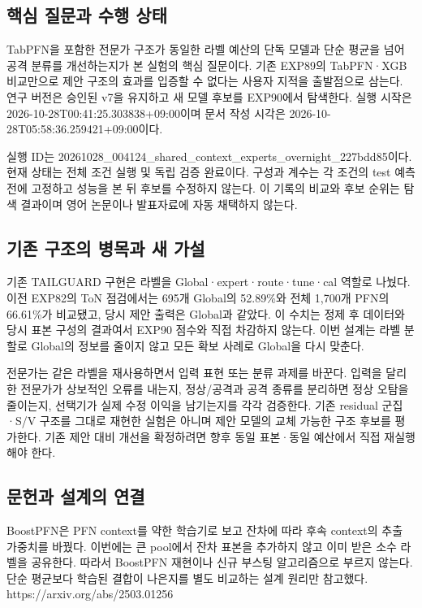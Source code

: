 

\subsection{핵심 질문과 수행 상태}
TabPFN을 포함한 전문가 구조가 동일한 라벨 예산의 단독 모델과 단순 평균을 넘어 공격 분류를 개선하는지가 본 실험의 핵심 질문이다. 기존 EXP89의 TabPFN·XGB 비교만으로 제안 구조의 효과를 입증할 수 없다는 사용자 지적을 출발점으로 삼는다. 연구 버전은 승인된 v7을 유지하고 새 모델 후보를 EXP90에서 탐색한다. 실행 시작은 2026-10-28T00:41:25.303838+\allowbreak{}09:00이며 문서 작성 시각은 2026-10-28T05:58:36.259421+\allowbreak{}09:00이다.

실행 ID는 20261028\_\allowbreak{}004124\_\allowbreak{}shared\_\allowbreak{}context\_\allowbreak{}experts\_\allowbreak{}overnight\_\allowbreak{}227bdd85이다. 현재 상태는 전체 조건 실행 및 독립 검증 완료이다. 구성과 계수는 각 조건의 test 예측 전에 고정하고 성능을 본 뒤 후보를 수정하지 않는다. 이 기록의 비교와 후보 순위는 탐색 결과이며 영어 논문이나 발표자료에 자동 채택하지 않는다.

\subsection{기존 구조의 병목과 새 가설}
기존 TAILGUARD 구현은 라벨을 Global·expert·route·tune·cal 역할로 나눴다. 이전 EXP82의 ToN 점검에서는 695개 Global의 52.89\%와 전체 1,700개 PFN의 66.61\%가 비교됐고, 당시 제안 출력은 Global과 같았다. 이 수치는 정제 후 데이터와 당시 표본 구성의 결과여서 EXP90 점수와 직접 차감하지 않는다. 이번 설계는 라벨 분할로 Global의 정보를 줄이지 않고 모든 확보 사례로 Global을 다시 맞춘다.

전문가는 같은 라벨을 재사용하면서 입력 표현 또는 분류 과제를 바꾼다. 입력을 달리한 전문가가 상보적인 오류를 내는지, 정상/\allowbreak{}공격과 공격 종류를 분리하면 정상 오탐을 줄이는지, 선택기가 실제 수정 이익을 남기는지를 각각 검증한다. 기존 residual 군집·S/\allowbreak{}V 구조를 그대로 재현한 실험은 아니며 제안 모델의 교체 가능한 구조 후보를 평가한다. 기존 제안 대비 개선을 확정하려면 향후 동일 표본·동일 예산에서 직접 재실행해야 한다.

\subsection{문헌과 설계의 연결}
BoostPFN은 PFN context를 약한 학습기로 보고 잔차에 따라 후속 context의 추출 가중치를 바꿨다. 이번에는 큰 pool에서 잔차 표본을 추가하지 않고 이미 받은 소수 라벨을 공유한다. 따라서 BoostPFN 재현이나 신규 부스팅 알고리즘으로 부르지 않는다. 단순 평균보다 학습된 결합이 나은지를 별도 비교하는 설계 원리만 참고했다. https:/\allowbreak{}/\allowbreak{}arxiv.org/\allowbreak{}abs/\allowbreak{}2503.01256

